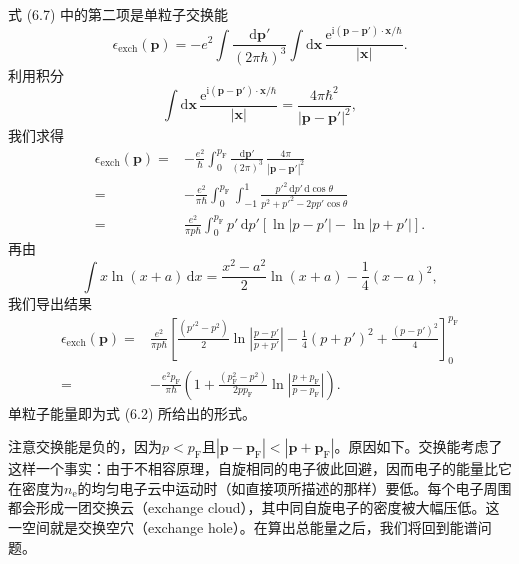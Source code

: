 式 (6.7) 中的第二项是单粒子交换能
\begin{equation*}
\epsilon_{\mathrm{exch}}(\mathbf{p}) = -e^2\int \frac{\mathrm{d}\mathbf{p}'}{(2\pi\hbar)^3}\int \mathrm{d}\mathbf{x}\, \frac{\mathrm{e}^{\mathrm{i}(\mathbf{p} - \mathbf{p}')\cdot\mathbf{x}/\hbar}}{|\mathbf{x}|}.
\tag{6.8}
\end{equation*}
利用积分
\begin{equation*}
\int \mathrm{d}\mathbf{x}\, \frac{\mathrm{e}^{\mathrm{i}(\mathbf{p} - \mathbf{p}')\cdot\mathbf{x}/\hbar}}{|\mathbf{x}|} = \frac{4\pi\hbar^2}{|\mathbf{p} - \mathbf{p}'|^2},
\tag{6.9}
\end{equation*}
我们求得
\begin{equation*}
\begin{aligned}
\epsilon_{\mathrm{exch}}(\mathbf{p}) ={} & -\frac{e^2}{\hbar}\int_0^{p_{\mathrm{F}}} \frac{\mathrm{d}\mathbf{p}'}{(2\pi)^3}\, \frac{4\pi}{|\mathbf{p} - \mathbf{p}'|^2} \\
={}& -\frac{e^2}{\pi\hbar}\int_0^{p_{\mathrm{F}}}\int_{-1}^{1} \frac{p'^2\,\mathrm{d}p'\,\mathrm{d}\cos\theta}{p^2 + p'^2 - 2pp'\cos\theta} \\
={}& \frac{e^2}{\pi p\hbar}\int_0^{p_{\mathrm{F}}} p'\,\mathrm{d}p'\left[\ln|p - p'| - \ln|p + p'|\right].
\end{aligned}
\tag{6.10}
\end{equation*}
再由
\begin{equation*}
\int x\ln(x + a)\,\mathrm{d}x = \frac{x^2 - a^2}{2}\ln(x + a) - \frac{1}{4}(x - a)^2,
\tag{6.11}
\end{equation*}
我们导出结果
\begin{equation*}
\begin{aligned}
\epsilon_{\mathrm{exch}}(\mathbf{p}) ={}& \frac{e^2}{\pi p\hbar}\left[\frac{(p'^2 - p^2)}{2}\ln\left|\frac{p - p'}{p + p'}\right| - \frac{1}{4}(p + p')^2 + \frac{(p - p')^2}{4}\right]_0^{p_{\mathrm{F}}} \\
={}& -\frac{e^2 p_{\mathrm{F}}}{\pi\hbar}\left(1 + \frac{(p_{\mathrm{F}}^2 - p^2)}{2pp_{\mathrm{F}}}\ln\left|\frac{p + p_{\mathrm{F}}}{p - p_{\mathrm{F}}}\right|\right).
\end{aligned}
\tag{6.12}
\end{equation*}
单粒子能量即为式 (6.2) 所给出的形式。

注意交换能是负的，因为$p < p_{\mathrm{F}}$且$|\mathbf{p} - \mathbf{p}_{\mathrm{F}}| < |\mathbf{p} + \mathbf{p}_{\mathrm{F}}|$。原因如下。交换能考虑了这样一个事实：由于不相容原理，自旋相同的电子彼此回避，因而电子的能量比它在密度为$n_{\mathrm{e}}$的均匀电子云中运动时（如直接项所描述的那样）要低。每个电子周围都会形成一团交换云（exchange cloud），其中同自旋电子的密度被大幅压低。这一空间就是交换空穴（exchange hole）。在算出总能量之后，我们将回到能谱问题。

